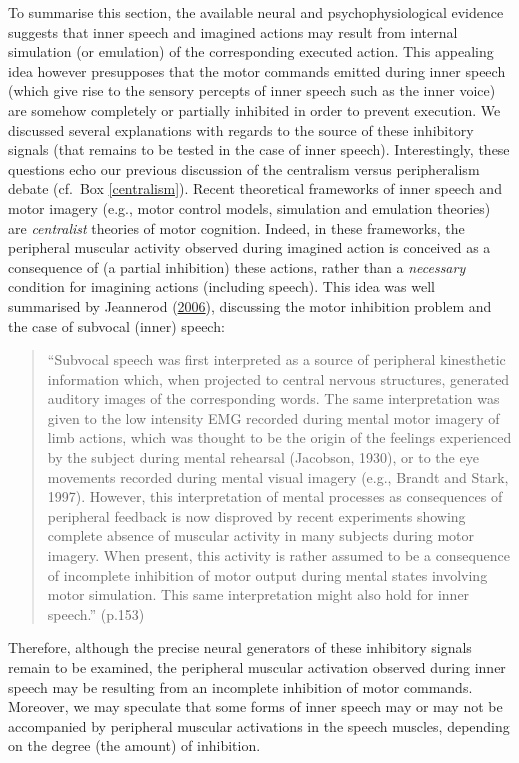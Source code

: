 \documentclass[a4paper,12pt,twoside,onecolumn,openright,final,oldfontcommands]{memoir}
\begin{document}
To summarise this section, the available neural and psychophysiological evidence suggests that inner speech and imagined actions may result from internal simulation (or emulation) of the corresponding executed action. This appealing idea however presupposes that the motor commands emitted during inner speech (which give rise to the sensory percepts of inner speech such as the inner voice) are somehow completely or partially inhibited in order to prevent execution. We discussed several explanations with regards to the source of these inhibitory signals (that remains to be tested in the case of inner speech). Interestingly, these questions echo our previous discussion of the centralism versus peripheralism debate (cf.~Box \ref{centralism}). Recent theoretical frameworks of inner speech and motor imagery (e.g., motor control models, simulation and emulation theories) are \emph{centralist} theories of motor cognition. Indeed, in these frameworks, the peripheral muscular activity observed during imagined action is conceived as a consequence of (a partial inhibition) these actions, rather than a \emph{necessary} condition for imagining actions (including speech). This idea was well summarised by Jeannerod (\protect\hyperlink{ref-jeannerod_motor_2006}{2006}), discussing the motor inhibition problem and the case of subvocal (inner) speech:

\begin{quote}
\enquote{Subvocal speech was first interpreted as a source of peripheral kinesthetic information which, when projected to central nervous structures, generated auditory images of the corresponding words. The same interpretation was given to the low intensity EMG recorded during mental motor imagery of limb actions, which was thought to be the origin of the feelings experienced by the subject during mental rehearsal (Jacobson, 1930), or to the eye movements recorded during mental visual imagery (e.g., Brandt and Stark, 1997). However, this interpretation of mental processes as consequences of peripheral feedback is now disproved by recent experiments showing complete absence of muscular activity in many subjects during motor imagery. When present, this activity is rather assumed to be a consequence of incomplete inhibition of motor output during mental states involving motor simulation. This same interpretation might also hold for inner speech.} (p.153)
\end{quote}

Therefore, although the precise neural generators of these inhibitory signals remain to be examined, the peripheral muscular activation observed during inner speech may be resulting from an incomplete inhibition of motor commands. Moreover, we may speculate that some forms of inner speech may or may not be accompanied by peripheral muscular activations in the speech muscles, depending on the degree (the amount) of inhibition.
\end{document}
